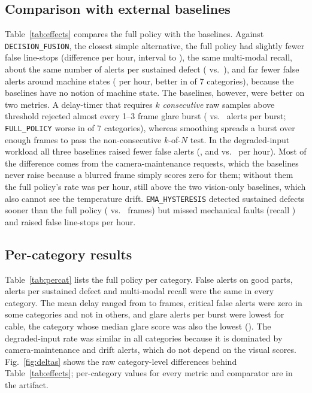 \documentclass[conference]{IEEEtran}
\begin{document}
\subsection{Comparison with external baselines}
Table~\ref{tab:effects} compares the full policy with the baselines. Against \texttt{DECISION\_FUSION}, the closest simple alternative, the full policy had slightly fewer false line-stops (difference \EffCritFAMultiFusion{} per hour, interval \EffCritFAMultiFusionLo{} to \EffCritFAMultiFusionHi{}), the same multi-modal recall, about the same number of alerts per sustained defect (\AlertsPerEpisodeFusion{} vs.\ \AlertsPerEpisodeFull{}), and far fewer false alerts around machine states (\EffFAStateFusion{} per hour, better in \EffFAStateFusionWins{} of 7 categories), because the baselines have no notion of machine state. The baselines, however, were better on two metrics. A delay-timer that requires $k$ \emph{consecutive} raw samples above threshold rejected almost every 1--3 frame glare burst (\GlarePerBurstTimer{} vs.\ \GlarePerBurstFull{} alerts per burst; \texttt{FULL\_POLICY} worse in \EffGlareTimerLosses{} of 7 categories), whereas smoothing spreads a burst over enough frames to pass the non-consecutive $k$-of-$N$ test. In the degraded-input workload all three baselines raised fewer false alerts (\DegradedFATimer{}, \DegradedFAHyst{} and \DegradedFAFusion{} vs.\ \DegradedFAFull{} per hour). Most of the difference comes from the camera-maintenance requests, which the baselines never raise because a blurred frame simply scores zero for them; without them the full policy's rate was \DegradedFAFullNoMaint{} per hour, still above the two vision-only baselines, which also cannot see the temperature drift. \texttt{EMA\_HYSTERESIS} detected sustained defects sooner than the full policy (\SustainedDelayHyst{} vs.\ \SustainedDelayFull{} frames) but missed mechanical faults (recall \MultiRecallHyst{}) and raised \CritFAHyst{} false line-stops per hour.

\subsection{Per-category results}
Table~\ref{tab:percat} lists the full policy per category. False alerts on good parts, alerts per sustained defect and multi-modal recall were the same in every category. The mean delay ranged from \PerCatDelayMin{} to \PerCatDelayMax{} frames, critical false alerts were zero in some categories and not in others, and glare alerts per burst were lowest for cable, the category whose median glare score was also the lowest (\GlareMedianMin{}). The degraded-input rate was similar in all categories because it is dominated by camera-maintenance and drift alerts, which do not depend on the visual scores. Fig.~\ref{fig:deltas} shows the raw category-level differences behind Table~\ref{tab:effects}; per-category values for every metric and comparator are in the artifact.
\end{document}
